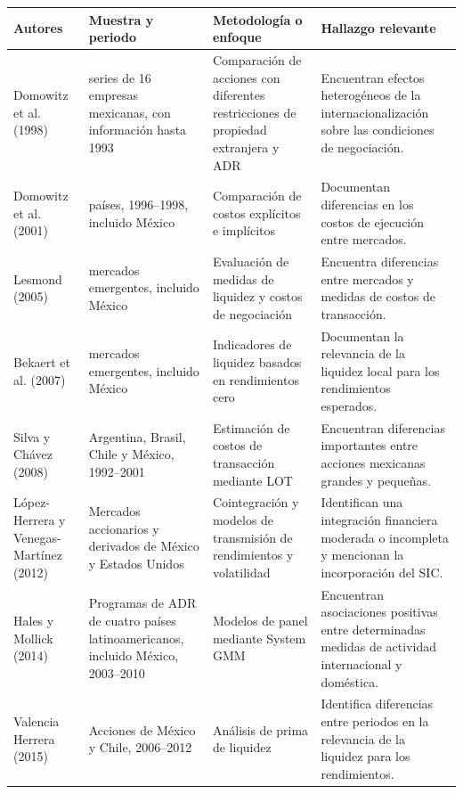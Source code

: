 {\small
\begin{longtable}[]{@{}
  >{\raggedright\arraybackslash}p{}
  >{\raggedright\arraybackslash}p{}
  >{\raggedright\arraybackslash}p{}
  >{\raggedright\arraybackslash}p{}@{}}
\toprule\noalign{}
\begin{minipage}[b]{\linewidth}\raggedright
\textbf{Autores}
\end{minipage} & \begin{minipage}[b]{\linewidth}\raggedright
\textbf{Muestra y periodo}
\end{minipage} & \begin{minipage}[b]{\linewidth}\raggedright
\textbf{Metodología o enfoque}
\end{minipage} & \begin{minipage}[b]{\linewidth}\raggedright
\textbf{Hallazgo relevante}
\end{minipage} \\
\midrule\noalign{}
\endhead
\bottomrule\noalign{}
\endlastfoot
Domowitz et al. (1998) & 25 series de 16 empresas mexicanas, con información hasta 1993 & Comparación de acciones con diferentes restricciones de propiedad extranjera y ADR & Encuentran efectos heterogéneos de la internacionalización sobre las condiciones de negociación. \\
Domowitz et al. (2001) & 42 países, 1996--1998, incluido México & Comparación de costos explícitos e implícitos & Documentan diferencias en los costos de ejecución entre mercados. \\
Lesmond (2005) & 31 mercados emergentes, incluido México & Evaluación de medidas de liquidez y costos de negociación & Encuentra diferencias entre mercados y medidas de costos de transacción. \\
Bekaert et al. (2007) & 19 mercados emergentes, incluido México & Indicadores de liquidez basados en rendimientos cero & Documentan la relevancia de la liquidez local para los rendimientos esperados. \\
Silva y Chávez (2008) & Argentina, Brasil, Chile y México, 1992--2001 & Estimación de costos de transacción mediante LOT & Encuentran diferencias importantes entre acciones mexicanas grandes y pequeñas. \\
López-Herrera y Venegas-Martínez (2012) & Mercados accionarios y derivados de México y Estados Unidos & Cointegración y modelos de transmisión de rendimientos y volatilidad & Identifican una integración financiera moderada o incompleta y mencionan la incorporación del SIC. \\
Hales y Mollick (2014) & Programas de ADR de cuatro países latinoamericanos, incluido México, 2003--2010 & Modelos de panel mediante System GMM & Encuentran asociaciones positivas entre determinadas medidas de actividad internacional y doméstica. \\
Valencia Herrera (2015) & Acciones de México y Chile, 2006--2012 & Análisis de prima de liquidez & Identifica diferencias entre periodos en la relevancia de la liquidez para los rendimientos. \\
\end{longtable}
}

